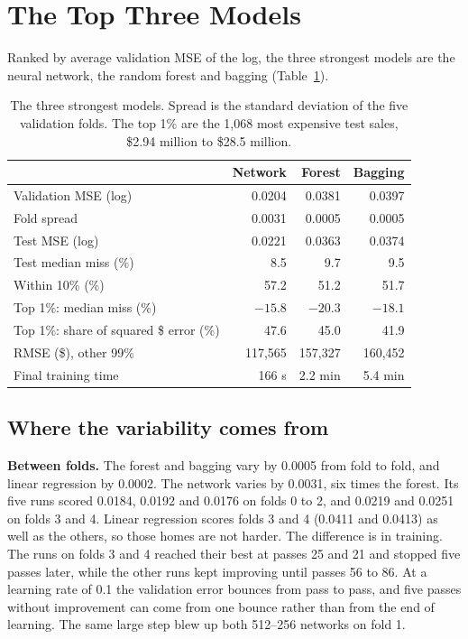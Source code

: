 \documentclass[sigconf,nonacm,10pt]{acmart}
\begin{document}
\section{The Top Three Models}
\label{sec:top}

Ranked by average validation MSE of the log, the three strongest models are the neural network, the random forest and bagging (Table~\ref{tab:top}).

\begin{table}[t]
\caption{The three strongest models. Spread is the standard deviation of the five validation folds. The top 1\% are the 1,068 most expensive test sales, \$2.94 million to \$28.5 million.}
\label{tab:top}
\small
\setlength{\tabcolsep}{4pt}
\begin{tabular}{@{}lrrr@{}}
\toprule
 & Network & Forest & Bagging \\
\midrule
Validation MSE (log) & 0.0204 & 0.0381 & 0.0397 \\
Fold spread & 0.0031 & 0.0005 & 0.0005 \\
Test MSE (log) & 0.0221 & 0.0363 & 0.0374 \\
Test median miss (\%) & 8.5 & 9.7 & 9.5 \\
Within 10\% (\%) & 57.2 & 51.2 & 51.7 \\
Top 1\%: median miss (\%) & $-15.8$ & $-20.3$ & $-18.1$ \\
Top 1\%: share of squared \$ error (\%) & 47.6 & 45.0 & 41.9 \\
RMSE (\$), other 99\% & 117,565 & 157,327 & 160,452 \\
Final training time & 166 s & 2.2 min & 5.4 min \\
\bottomrule
\end{tabular}
\end{table}

\subsection{Where the variability comes from}
\textbf{Between folds.} The forest and bagging vary by 0.0005 from fold to fold, and linear regression by 0.0002. The network varies by 0.0031, six times the forest. Its five runs scored 0.0184, 0.0192 and 0.0176 on folds 0 to 2, and 0.0219 and 0.0251 on folds 3 and 4. Linear regression scores folds 3 and 4 (0.0411 and 0.0413) as well as the others, so those homes are not harder. The difference is in training. The runs on folds 3 and 4 reached their best at passes 25 and 21 and stopped five passes later, while the other runs kept improving until passes 56 to 86. At a learning rate of 0.1 the validation error bounces from pass to pass, and five passes without improvement can come from one bounce rather than from the end of learning. The same large step blew up both 512--256 networks on fold 1.
\end{document}
